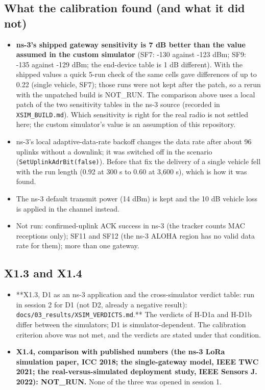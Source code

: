 \subsection*{What the calibration found (and what it did not)}
\begin{itemize}
\item \textbf{ns-3's shipped gateway sensitivity is 7 dB better than the value assumed in the custom simulator} (SF7: -130 against -123 dBm; SF9: -135 against -129 dBm; the end-device table is 1 dB different). With the shipped values a quick 5-run check of the same cells gave differences of up to 0.22 (single vehicle, SF7); those runs were not kept after the patch, so a rerun with the unpatched build is NOT\_RUN. The comparison above uses a local patch of the two sensitivity tables in the ns-3 source (recorded in \texttt{XSIM\_BUILD.md}). Which sensitivity is right for the real radio is not settled here; the custom simulator's value is an assumption of this repository.
\item ns-3's local adaptive-data-rate backoff changes the data rate after about 96 uplinks without a downlink; it was switched off in the scenario (\texttt{SetUplinkAdrBit(false)}). Before that fix the delivery of a single vehicle fell with the run length (0.92 at 300 s to 0.60 at 3,600 s), which is how it was found.
\item The ns-3 default transmit power (14 dBm) is kept and the 10 dB vehicle loss is applied in the channel instead.
\item Not run: confirmed-uplink ACK success in ns-3 (the tracker counts MAC receptions only); SF11 and SF12 (the ns-3 ALOHA region has no valid data rate for them); more than one gateway.
\end{itemize}

\subsection*{X1.3 and X1.4}
\begin{itemize}
\item **X1.3, D1 as an ns-3 application and the cross-simulator verdict table: run in session 2 for D1 (not D2, already a negative result): \texttt{docs/03\_results/XSIM\_VERDICTS.md}.** The verdicts of H-D1a and H-D1b differ between the simulators; D1 is simulator-dependent. The calibration criterion above was not met, and the verdicts are stated under that condition.
\item \textbf{X1.4, comparison with published numbers (the ns-3 LoRa simulation paper, ICC 2018; the single-gateway model, IEEE TWC 2021; the real-versus-simulated deployment study, IEEE Sensors J. 2022): NOT\_RUN.} None of the three was opened in session 1.
\end{itemize}



